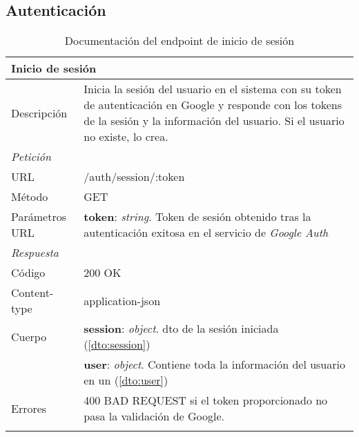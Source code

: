 \subsection{Autenticación}

\begin{longtable}{|p{} p{}|}
    \hline
    \multicolumn{2}{|l|}{\textbf{Inicio de sesión}} \\ \hline 
    Descripción         & Inicia la sesión del usuario en el sistema con su token de autenticación en Google y responde con los tokens de la sesión y la información del usuario. Si el usuario no existe, lo crea. \\ \hline \hline
    \multicolumn{2}{|l|}{\emph{Petición}}  \\ \hline 
    URL      & /auth/session/:token \\ \hline
    Método   & GET                  \\ \hline
    Parámetros URL  & 
    \textbf{token}: \emph{string}. Token de sesión obtenido tras la autenticación exitosa en el servicio de \emph{Google Auth} \\ \hline \hline
    \multicolumn{2}{|l|}{\emph{Respuesta}} \\ \hline 
    Código          & 200 OK          \\ \hline
    Content-type    & application-json  \\ \hline
    Cuerpo  & 
    \textbf{session}: \emph{object}. \acrshort{dto} de la sesión iniciada (\ref{dto:session}) \\
    & \textbf{user}: \emph{object}. Contiene toda la información del usuario en un \nameref{dto:user} (\ref{dto:user})
    \\ \hline \hline
    Errores & 400 BAD REQUEST si el token proporcionado no pasa la validación de Google. 
    \\ \hline
    \caption{Documentación del endpoint de inicio de sesión}
    \label{api:inicio_sesion}
\end{longtable}

